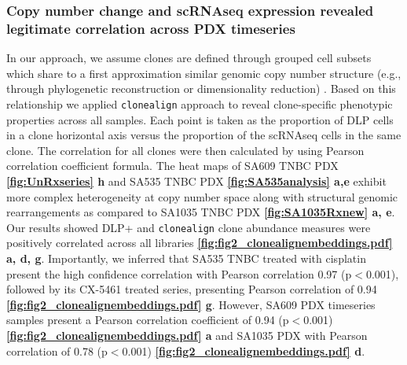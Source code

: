 \subsubsection{Copy number change and scRNAseq expression revealed legitimate correlation across PDX timeseries}
  In our approach, we assume clones are defined through grouped cell subsets which share to a first approximation similar genomic copy number structure (e.g., through phylogenetic reconstruction or dimensionality reduction) \cite{laks2019clonal}. Based on this relationship we applied
  \texttt{clonealign} approach \cite{campbell2019clonealign} to reveal clone-specific phenotypic properties across all samples.
  Each point is taken as the proportion of DLP cells in a clone horizontal axis versus the proportion of the scRNAseq cells in the same clone. The  correlation for all clones were then calculated by using Pearson correlation coefficient formula. The heat maps of SA609 TNBC PDX \textbf{\autoref{fig:UnRxseries} h} and SA535 TNBC PDX \textbf{\autoref{fig:SA535analysis} a,e} exhibit more complex heterogeneity at copy number space along with structural genomic rearrangements as compared to SA1035 TNBC PDX \textbf{\autoref{fig:SA1035Rxnew} a, e}. Our results showed DLP+ and \texttt{clonealign} clone abundance measures were positively correlated across all libraries \textbf{\autoref{fig:fig2_clonealignembeddings.pdf} a, d, g}. Importantly, we inferred that SA535 TNBC treated with cisplatin present the high confidence correlation with Pearson correlation 0.97 (p$<$0.001), followed by its CX-5461 treated series, presenting Pearson correlation of 0.94 \textbf{\autoref{fig:fig2_clonealignembeddings.pdf} g}. However, SA609 PDX timeseries samples present a Pearson correlation coefficient of 0.94 (p$<$0.001) \textbf{\autoref{fig:fig2_clonealignembeddings.pdf} a} and SA1035 PDX with Pearson correlation of 0.78 (p$<$0.001) \textbf{\autoref{fig:fig2_clonealignembeddings.pdf} d}.
  
  

